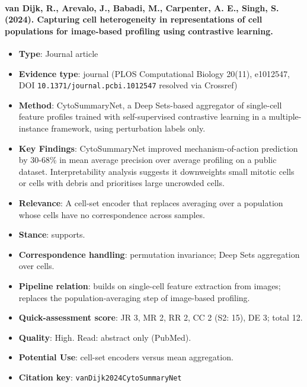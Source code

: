 \documentclass[journal,onecolumn]{IEEEtran}
\begin{document}
\paragraph{van Dijk, R., Arevalo, J., Babadi, M., Carpenter, A. E., Singh, S. (2024). Capturing cell heterogeneity in representations of cell populations for image-based profiling using contrastive learning.~\cite{vanDijk2024CytoSummaryNet}}\mbox{}

\begin{itemize}

\item{} \textbf{Type}: Journal article

\item{} \textbf{Evidence type}: journal (PLOS Computational Biology 20(11), e1012547, DOI \nolinkurl{10.1371/journal.pcbi.1012547} resolved via Crossref)

\item{} \textbf{Method}: CytoSummaryNet, a Deep Sets-based aggregator of single-cell feature profiles trained with self-supervised contrastive learning in a multiple-instance framework, using perturbation labels only.

\item{} \textbf{Key Findings}: CytoSummaryNet improved mechanism-of-action prediction by 30-68\% in mean average precision over average profiling on a public dataset. Interpretability analysis suggests it downweights small mitotic cells or cells with debris and prioritises large uncrowded cells.

\item{} \textbf{Relevance}: A cell-set encoder that replaces averaging over a population whose cells have no correspondence across samples.

\item{} \textbf{Stance}: supports.

\item{} \textbf{Correspondence handling}: permutation invariance; Deep Sets aggregation over cells.

\item{} \textbf{Pipeline relation}: builds on single-cell feature extraction from images; replaces the population-averaging step of image-based profiling.

\item{} \textbf{Quick-assessment score}: JR 3, MR 2, RR 2, CC 2 (S2: 15), DE 3; total 12.

\item{} \textbf{Quality}: High. Read: abstract only (PubMed).

\item{} \textbf{Potential Use}: cell-set encoders versus mean aggregation.

\item{} \textbf{Citation key}: \texttt{vanDijk2024CytoSummaryNet}

\end{itemize}
\end{document}
